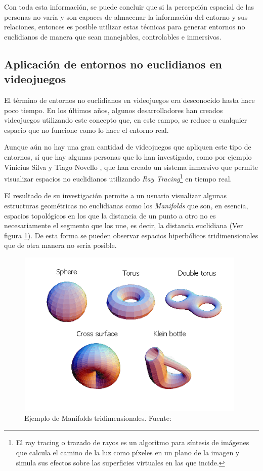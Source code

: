 \documentclass[../main.tex]{subfiles}
\begin{document}
Con toda esta información, se puede concluir que si la percepción espacial de las personas no varía y son capaces de almacenar la información del entorno y sus relaciones, entonces es posible utilizar estas técnicas para generar entornos no euclidianos de manera que sean manejables, controlables e inmersivos.

\subsection{Aplicación de entornos no euclidianos en videojuegos}

El término de entornos no euclidianos en videojuegos era desconocido hasta hace poco tiempo. En los últimos años, algunos desarrolladores han creados videojuegos utilizando este concepto que, en este campo, se reduce a cualquier espacio que no funcione como lo hace el entorno real.

Aunque aún no hay una gran cantidad de videojuegos que apliquen este tipo de entornos, sí que hay algunas personas que lo han investigado, como por ejemplo Vinícius Silva y Tiago Novello \cite{NE_Videogames_3D}, que han creado un sistema inmersivo que permite visualizar espacios no euclidianos utilizando \textit{Ray Tracing}\footnote{El ray tracing o trazado de rayos es un algoritmo para síntesis de imágenes que calcula el camino de la luz como píxeles en un plano de la imagen y simula sus efectos sobre las superficies virtuales en las que incide.} en tiempo real. 

El resultado de su investigación permite a un usuario visualizar algunas estructuras geométricas no euclidianas como los \textit{Manifolds} que son, en esencia, espacios topológicos en los que la distancia de un punto a otro no es necesariamente el segmento que los une, es decir, la distancia euclidiana (Ver figura \ref{fig:Manifold}). De esta forma se pueden observar espacios hiperbólicos tridimensionales que de otra manera no sería posible.

\begin{figure}[htbp]
\centering
\includegraphics[width= 11cm, height= 8cm]{imagenes/Manifold.png}
\caption{Ejemplo de Manifolds tridimensionales. Fuente:\cite{Manifold}}
\label{fig:Manifold}
\end{figure}
\end{document}
